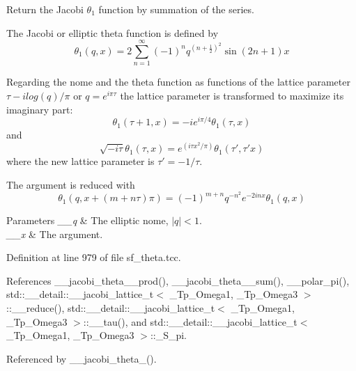 Return the Jacobi $ \theta_1 $ function by summation of the series.

The Jacobi or elliptic theta function is defined by \[ \theta_1(q,x) = 2\sum_{n=1}^{\infty}(-1)^n q^{(n+\frac{1}{2})^2}\sin{(2n+1)x} \]

Regarding the nome and the theta function as functions of the lattice parameter $ \tau -i log(q)/ \pi $ or $ q = e^{i\pi\tau} $ the lattice parameter is transformed to maximize its imaginary part\+: \[ \theta_1(\tau+1,x) = -i e^{i\pi/4}\theta_1(\tau,x) \] and \[ \sqrt{-i\tau}\theta_1(\tau,x) = e^{(i\tau x^2/\pi)}\theta_1(\tau',\tau' x) \] where the new lattice parameter is $ \tau' = -1/\tau $.

The argument is reduced with \[ \theta_1(q, x+(m+n\tau)\pi) = (-1)^{m+n}q^{-n^2}e^{-2inx}\theta_1(q, x) \]


\begin{DoxyParams}{Parameters}
{\em \+\_\+\+\_\+q} & The elliptic nome, $ |q| < 1 $. \\
\hline
{\em \+\_\+\+\_\+x} & The argument. \\
\hline
\end{DoxyParams}


Definition at line 979 of file sf\+\_\+theta.\+tcc.



References \+\_\+\+\_\+jacobi\+\_\+theta\+\_\+\_\+prod(), \+\_\+\+\_\+jacobi\+\_\+theta\+\_\+\_\+sum(), \+\_\+\+\_\+polar\+\_\+pi(), std\+::\+\_\+\+\_\+detail\+::\+\_\+\+\_\+jacobi\+\_\+lattice\+\_\+t$<$ \+\_\+\+Tp\+\_\+\+Omega1, \+\_\+\+Tp\+\_\+\+Omega3 $>$\+::\+\_\+\+\_\+reduce(), std\+::\+\_\+\+\_\+detail\+::\+\_\+\+\_\+jacobi\+\_\+lattice\+\_\+t$<$ \+\_\+\+Tp\+\_\+\+Omega1, \+\_\+\+Tp\+\_\+\+Omega3 $>$\+::\+\_\+\+\_\+tau(), and std\+::\+\_\+\+\_\+detail\+::\+\_\+\+\_\+jacobi\+\_\+lattice\+\_\+t$<$ \+\_\+\+Tp\+\_\+\+Omega1, \+\_\+\+Tp\+\_\+\+Omega3 $>$\+::\+\_\+\+S\+\_\+pi.



Referenced by \+\_\+\+\_\+jacobi\+\_\+theta\+\_().

\mbox{\label{namespacestd_1_1____detail_af98af6bb3dd83f6a28c777d8fbaa5e51}} 
